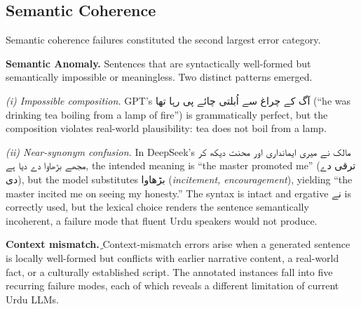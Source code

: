 \documentclass[11pt]{article}
\begin{document}
\subsection{Semantic Coherence}

Semantic coherence failures constituted the second 
largest error category. 

\textbf{Semantic Anomaly.} 
Sentences
that are syntactically well-formed but semantically
impossible or meaningless. Two distinct patterns emerged. 

\textit{(i) Impossible composition.} GPT's
\foreignlanguage{arabic}{آگ کے چراغ سے اُبلتی چائے پی رہا تھا}
(``he was drinking tea boiling from a lamp of fire'')
is grammatically perfect, but the composition
violates real-world plausibility: tea does not boil
from a lamp.

\textit{(ii) Near-synonym confusion.} In DeepSeek's
\foreignlanguage{arabic}{مالک نے میری ایمانداری اور محنت دیکھ کر مجھے بڑھاوا دے دیا ہے},
the intended meaning is ``the master promoted me''
(\foreignlanguage{arabic}{ترقی دے دی}), but the model
substitutes \foreignlanguage{arabic}{بڑھاوا}
(\emph{incitement, encouragement}), yielding ``the
master incited me on seeing my honesty.'' The syntax
is intact and ergative \foreignlanguage{arabic}{نے} is
correctly used, but the lexical choice renders the
sentence semantically incoherent, a failure mode that
fluent Urdu speakers would not produce.

\textbf{Context mismatch.}ِ\label{sec:context_mismatch} Context-mismatch errors arise when a generated
sentence is locally well-formed but conflicts with
earlier narrative content, a real-world fact, or a
culturally established script. The
annotated instances fall into five recurring failure
modes, each of which reveals a different limitation
of current Urdu LLMs.
\end{document}
